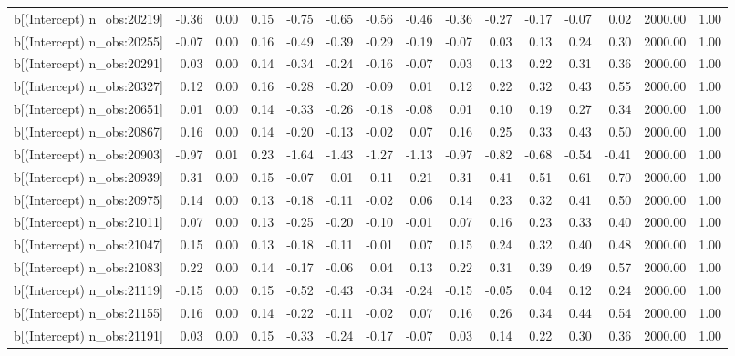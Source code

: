 \begin{table}[ht]
\begin{tabular}{rrrrrrrrrrrrrrr}
  b[(Intercept) n\_obs:20219] & -0.36 & 0.00 & 0.15 & -0.75 & -0.65 & -0.56 & -0.46 & -0.36 & -0.27 & -0.17 & -0.07 & 0.02 & 2000.00 & 1.00 \\ 
  b[(Intercept) n\_obs:20255] & -0.07 & 0.00 & 0.16 & -0.49 & -0.39 & -0.29 & -0.19 & -0.07 & 0.03 & 0.13 & 0.24 & 0.30 & 2000.00 & 1.00 \\ 
  b[(Intercept) n\_obs:20291] & 0.03 & 0.00 & 0.14 & -0.34 & -0.24 & -0.16 & -0.07 & 0.03 & 0.13 & 0.22 & 0.31 & 0.36 & 2000.00 & 1.00 \\ 
  b[(Intercept) n\_obs:20327] & 0.12 & 0.00 & 0.16 & -0.28 & -0.20 & -0.09 & 0.01 & 0.12 & 0.22 & 0.32 & 0.43 & 0.55 & 2000.00 & 1.00 \\ 
  b[(Intercept) n\_obs:20651] & 0.01 & 0.00 & 0.14 & -0.33 & -0.26 & -0.18 & -0.08 & 0.01 & 0.10 & 0.19 & 0.27 & 0.34 & 2000.00 & 1.00 \\ 
  b[(Intercept) n\_obs:20867] & 0.16 & 0.00 & 0.14 & -0.20 & -0.13 & -0.02 & 0.07 & 0.16 & 0.25 & 0.33 & 0.43 & 0.50 & 2000.00 & 1.00 \\ 
  b[(Intercept) n\_obs:20903] & -0.97 & 0.01 & 0.23 & -1.64 & -1.43 & -1.27 & -1.13 & -0.97 & -0.82 & -0.68 & -0.54 & -0.41 & 2000.00 & 1.00 \\ 
  b[(Intercept) n\_obs:20939] & 0.31 & 0.00 & 0.15 & -0.07 & 0.01 & 0.11 & 0.21 & 0.31 & 0.41 & 0.51 & 0.61 & 0.70 & 2000.00 & 1.00 \\ 
  b[(Intercept) n\_obs:20975] & 0.14 & 0.00 & 0.13 & -0.18 & -0.11 & -0.02 & 0.06 & 0.14 & 0.23 & 0.32 & 0.41 & 0.50 & 2000.00 & 1.00 \\ 
  b[(Intercept) n\_obs:21011] & 0.07 & 0.00 & 0.13 & -0.25 & -0.20 & -0.10 & -0.01 & 0.07 & 0.16 & 0.23 & 0.33 & 0.40 & 2000.00 & 1.00 \\ 
  b[(Intercept) n\_obs:21047] & 0.15 & 0.00 & 0.13 & -0.18 & -0.11 & -0.01 & 0.07 & 0.15 & 0.24 & 0.32 & 0.40 & 0.48 & 2000.00 & 1.00 \\ 
  b[(Intercept) n\_obs:21083] & 0.22 & 0.00 & 0.14 & -0.17 & -0.06 & 0.04 & 0.13 & 0.22 & 0.31 & 0.39 & 0.49 & 0.57 & 2000.00 & 1.00 \\ 
  b[(Intercept) n\_obs:21119] & -0.15 & 0.00 & 0.15 & -0.52 & -0.43 & -0.34 & -0.24 & -0.15 & -0.05 & 0.04 & 0.12 & 0.24 & 2000.00 & 1.00 \\ 
  b[(Intercept) n\_obs:21155] & 0.16 & 0.00 & 0.14 & -0.22 & -0.11 & -0.02 & 0.07 & 0.16 & 0.26 & 0.34 & 0.44 & 0.54 & 2000.00 & 1.00 \\ 
  b[(Intercept) n\_obs:21191] & 0.03 & 0.00 & 0.15 & -0.33 & -0.24 & -0.17 & -0.07 & 0.03 & 0.14 & 0.22 & 0.30 & 0.36 & 2000.00 & 1.00 \\ 

\end{tabular}
\end{table}
